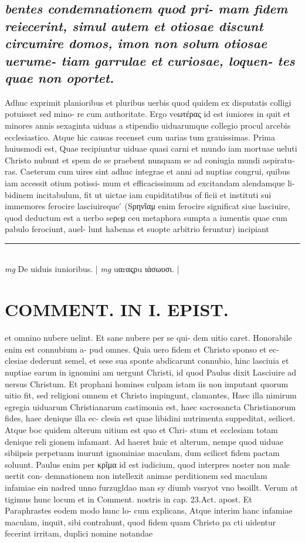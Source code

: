 \documentclass{article}
\begin{document}
\begin{pages}
\subsection*{\textit{bentes condemnationem quod pri- mam fidem reiecerint, simul autem et otiosae discunt circumire domos, imon non solum otiosae uerume- tiam garrulae et curiosae, loquen- tes quae non oportet. }}\pstart Adhuc exprimit planioribus et pluribus uerbis quod quidem ex disputatis colligi potuisset sed mino- re cum authoritate. Ergo veωτέρας id est iuniores in quit et minores annis sexaginta uiduas a stipendio uiduarumque collegio procul arcebis ecclesiastico. Atque  hic causas recenset cum uarias tum grauissimas. Prima huiusmodi est, Quae recipiuntur uiduae quasi carni et mundo iam mortuae ueluti Christo nubunt et spem de se praebent nunquam se ad coniugia mundi aspiratu- ras. Caeterum cum uires sint adhuc integrae et anni ad nuptias congrui, quibus iam accessit otium potissi- mum et efficacissimum ad excitandam alendamque li- bidinem incitabulum, fit ut uictae iam cupiditatibus of ficii et instituti sui immemores ferocire lasciuireque ́ (Sρηνῖαμ enim ferocire significat siue lasciuire, quod deductum est a uerbo seρeμ ceu metaphora sumpta a iumentis quae cum pabulo ferociunt, auel- lunt habenas et suopte arbitrio feruntur) incipiant  \pend
\vspace{0.5cm}\noindent
\vspace{0.2cm}\rule{1cm}{0.2pt}\\ 
\hspace{0.2cm}\textit{mg}
\footnotesize De uiduis iunioribus. 
\normalsize| 
\hspace{0.2cm}\textit{mg}
\footnotesize uαrαςρu ιἁσωυσι. 
\normalsize| 
\section*{COMMENT. IN I. EPIST. }\pstart et omnino nubere uelint. Et sane nubere per se qui- dem uitio caret. Honorabile enim est connubium a- pud omnes. Quia uero fidem et Christo sponso et ec- clesiae dederunt semel, et sese sua sponte abdicarunt connubio, hinc lasciuia et nuptiae earum in ignomini am uergunt Christi, id quod Paulus dixit Lasciuire ad uersus Christum. Et prophani homines culpam istam iis non imputant quorum uitio fit, sed religioni omnem et Christo impingunt, clamantes, Haec illa nimirum egregia uiduarum Christianarum castimonia est, haec sacrosancta Christianorum fides, haec denique illa ec- clesia est quae libidini nutrimenta suppeditat, seilicet. Atque boc quidem alterum uitium est quo et Chri- stum et ecclesiam totam denique reli gionem infamant. Ad haeret huic et alterum, nempe quod uiduae sibiipsis perpetuam inurunt ignominiae maculam, dum scilicet fidem pactam soluunt. Paulus enim per κρῖμα id est iudicium, quod interpres noster non male uertit con- demnationem non intellexit animae perditionem sed maculam infamiae ein nadred unno furzugldao man sy diumb vssryot vno bsoillt. Verum at tigimus hunc locum et in Comment. nostris in cap. 23.Act. apost. Et Paraphrastes eodem modo hunc lo- cum explicans, Atque interim hanc infamiae maculam, inquit, sibi contrahunt, quod fidem quam Christo pa cti uidentur fecerint irritam, duplici nomine notandae  \pend

\end{pages}
\end{document}
